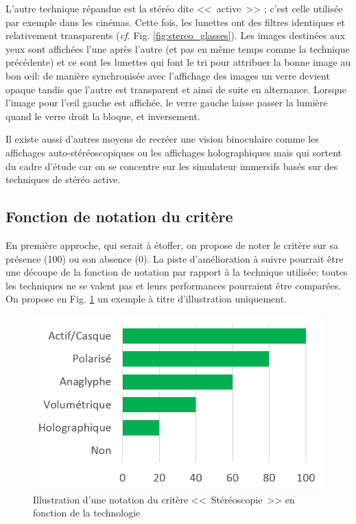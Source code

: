 	\par L'autre technique répandue est la stéréo dite <<~active~>> ; c'est celle utilisée par exemple dans les cinémas. Cette fois, les lunettes ont des filtres identiques et relativement transparents (\textit{cf.} Fig. \ref{fig:stereo_glasses}). Les images destinées aux yeux sont affichées l'une après l'autre (et pas en même temps comme la technique précédente) et ce sont les lunettes qui font le tri pour attribuer la bonne image au bon œil: de manière synchronisée avec l'affichage des images un verre devient opaque tandis que l'autre est transparent et ainsi de suite en alternance. Lorsque l'image pour l'œil gauche est affichée, le verre gauche laisse passer la lumière quand le verre droit la bloque, et inversement.
	
	\par Il existe aussi d'autres moyens de recréer une vision binoculaire comme les affichages auto-stéréoscopiques ou les affichages holographiques mais qui sortent du cadre d'étude car on se concentre sur les simulateur immersifs basés sur des techniques de stéréo active. 
	
	\subsection{Fonction de notation du critère}
	\par En première approche, qui serait à étoffer, on propose de noter le critère sur sa présence (100) ou son absence (0). La piste d'amélioration à suivre pourrait être une découpe de la fonction de notation par rapport à la technique utilisée: toutes les techniques ne se valent pas et leurs performances pourraient être comparées. On propose en Fig. \ref{fig:stereo_grade_techno} un exemple à titre d'illustration uniquement.
	
	\begin{figure}
		\centering
		\includegraphics[scale=1]{Figures/StereoTechnoScore}
		\caption{Illustration d'une notation du critère <<~Stéréoscopie~>> en fonction de la technologie}
		\label{fig:stereo_grade_techno}
	\end{figure}
	
